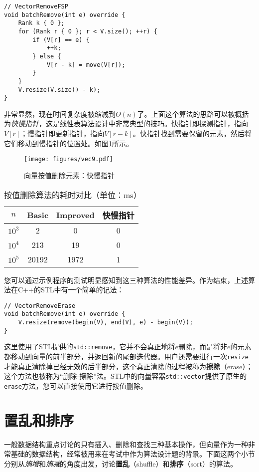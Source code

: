\begin{lstlisting}
// VectorRemoveFSP
void batchRemove(int e) override {
    Rank k { 0 };
    for (Rank r { 0 }; r < V.size(); ++r) {
        if (V[r] == e) {
            ++k;
        } else {
            V[r - k] = move(V[r]);
        }
    }
    V.resize(V.size() - k);
}
\end{lstlisting}

非常显然，现在时间复杂度被缩减到$\Theta(n)$了。上面这个算法的思路可以被概括为\textit{快慢指针}，这是线性表算法设计中非常典型的技巧。快指针即探测指针，指向$V[r]$；慢指针即更新指针，指向$V[r-k]$。快指针找到需要保留的元素，然后将它们移动到慢指针的位置处。如图\ref{fig:vec9}所示。

\begin{figure}
  \centering
  \texttt{[image: figures/vec9.pdf]}
  \caption{向量按值删除元素：快慢指针}
  \label{fig:vec9}
\end{figure}

\begin{table}
  \centering
  \caption{按值删除算法的耗时对比（单位：ms）}
  \begin{tabular}{c|ccc}
    \toprule
       $n$ & Basic & Improved & 快慢指针  
      \\
    \midrule
    $10^3$ & 2 & 0 & 0 \\
    $10^4$ & 213 & 19 & 0 \\
    $10^5$ & 20192 &  1972 & 1
      \\ 
    \bottomrule
  \end{tabular}
  \label{tab:vec3}
\end{table}

您可以通过示例程序的测试明显感知到这三种算法的性能差异。作为结束，上述算法在C++的STL中有一个简单的记法：

\begin{lstlisting}
// VectorRemoveErase
void batchRemove(int e) override {
    V.resize(remove(begin(V), end(V), e) - begin(V));
}
\end{lstlisting}

这里使用了STL提供的\lstinline{std::remove}，它并不会真正地将$e$删除，而是将非$e$的元素都移动到向量的前半部分，并返回新的尾部迭代器。用户还需要进行一次\lstinline{resize}才能真正清除掉已经无效的后半部分，这个真正清除的过程被称为\textbf{擦除}（erase）；这个方法也被称为“删除-擦除”法。STL中的向量容器\lstinline{std::vector}提供了原生的\lstinline{erase}方法，您可以直接使用它进行按值删除。

\section{置乱和排序}
一般数据结构重点讨论的只有插入、删除和查找三种基本操作，但向量作为一种非常基础的数据结构，经常被用来在考试中作为算法设计题的背景。下面这两个小节分别从\textit{熵增}和\textit{熵减}的角度出发，讨论\textbf{置乱}（shuffle）和\textbf{排序}（sort）的算法。

